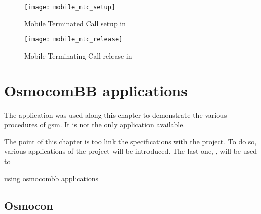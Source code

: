       \begin{figure}
        \centering
        \texttt{[image: mobile\_mtc\_setup]}
        \caption{Mobile Terminated Call
          setup in ~\cite[p.~115]{3gpp_ts_2014-6}}
        \label{fig:mobile_mtc_setup}
      \end{figure}

      \begin{figure}
        \centering
        \texttt{[image: mobile\_mtc\_release]}
        \caption{Mobile Terminating Call
        release in ~\cite[p.~116]{3gpp_ts_2014-6}}
        \label{fig:mobile_mtc_release}
      \end{figure}

      \iffalse
  \section{OsmocomBB applications}

    The  application was used along this chapter to
    demonstrate the various procedures of \gls{gsm}. It is not the only
    application available.


    The point of this chapter is too link the specifications with the
     project. To do so, various applications of the
    project will be introduced. The last one, , will be
    used to 



    using osmocombb applications
      ~\cite{osmocombb_applications}
      ~\cite{osmocombb_overview}

    \subsection{Osmocon}

    \iffalse
      \begin{figure}[h]
        \centering
        \texttt{[image: osmocombb\_arch1]}
        \caption{~\cite{osmocombb_overview}}
        \label{fig:osmocombb_arch1}
      \end{figure}

      \begin{figure}[h]
        \centering
        \texttt{[image: osmocombb\_arch2]}
        \caption{~\cite{osmocombb_overview}}
        \label{fig:osmocombb_arch2}
      \end{figure}

      \begin{figure}[h]
        \centering
        \texttt{[image: osmocombb\_arch3]}
        \caption{~\cite{osmocombb_overview}}
        \label{fig:osmocombb_arch3}
      \end{figure}
      \fi

